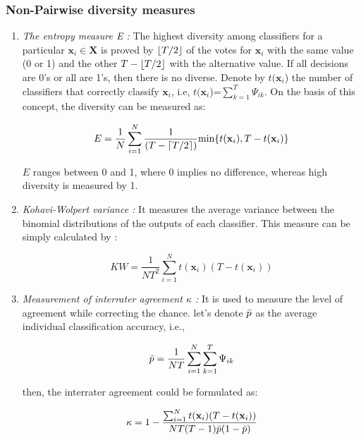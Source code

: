  
 
 
\subsubsection{Non-Pairwise diversity measures}

\begin{enumerate}
   
 \item \textit{The entropy measure E :}    The highest diversity among classifiers for a particular $\textbf{x}_i \in \textbf{X}$ is proved by $\lfloor T/2\rfloor$ of the votes for $\textbf{x}_i$ with the same value (0 or 1) and the other $T - \lfloor T/2\rfloor$ with the alternative value. If all decisions are 0's or all are 1's, then there is no diverse. Denote by $t(\textbf{x}_i$) the number of classifiers that correctly classify $\textbf{x}_i$, i.e,  $t(\textbf{x}_i$)=$\sum_{k=1}^{T} \Psi_{ik}$. On the basis of this concept, the diversity can be measured as:
    
   \begin{equation}
\label{Entropy.measure}
 E=\frac{1}{N} \sum_{i=1}^{N} \frac{1}{(T-\lceil T/2\rceil)} \text{min}\{t(\textbf{x}_i),T-t(\textbf{x}_i)\}
\end{equation}   
  
$E$ ranges between 0 and 1, where 0 implies no difference, whereas high diversity is measured by 1.  
  
\item \textit{Kohavi-Wolpert variance :} It measures the average variance between the binomial distributions of the outputs of each classifier. This measure can be simply calculated by :
 
   \begin{equation}
\label{Kohavi.measure}
 KW=\frac{1}{NT^2} \sum_{i=1}^{N} t(\textbf{x}_i)(T-t(\textbf{x}_i))
\end{equation}   
  
  
 \item \textit{Measurement of interrater agreement $\kappa$ :} It is used to measure the level of agreement while correcting the chance. let's denote $\Bar{p}$ as the average individual classification accuracy, i.e.,
 
\begin{equation}
\label{individual.accuracy}
 \Bar{p}=\frac{1}{NT} \sum_{i=1}^{N}\sum_{k=1}^{T} \Psi_{ik}
\end{equation}   
  
 
 then, the interrater agreement could be formulated as:
 
\begin{equation}
\label{interrater.agreement}
 \kappa=1-\frac{\sum_{i=1}^{N}t(\textbf{x}_i)(T-t(\textbf{x}_i))}{NT(T-1)\Bar{p}(1-\Bar{p})} 
\end{equation} 
    
\end{enumerate}





